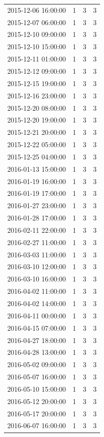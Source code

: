 \begin{tabular}{lrrr}
2015-12-06 16:00:00 & 1 & 3 & 3 \\
2015-12-07 06:00:00 & 1 & 3 & 3 \\
2015-12-10 09:00:00 & 1 & 3 & 3 \\
2015-12-10 15:00:00 & 1 & 3 & 3 \\
2015-12-11 01:00:00 & 1 & 3 & 3 \\
2015-12-12 09:00:00 & 1 & 3 & 3 \\
2015-12-15 19:00:00 & 1 & 3 & 3 \\
2015-12-16 23:00:00 & 1 & 3 & 3 \\
2015-12-20 08:00:00 & 1 & 3 & 3 \\
2015-12-20 19:00:00 & 1 & 3 & 3 \\
2015-12-21 20:00:00 & 1 & 3 & 3 \\
2015-12-22 05:00:00 & 1 & 3 & 3 \\
2015-12-25 04:00:00 & 1 & 3 & 3 \\
2016-01-13 15:00:00 & 1 & 3 & 3 \\
2016-01-19 16:00:00 & 1 & 3 & 3 \\
2016-01-19 17:00:00 & 1 & 3 & 3 \\
2016-01-27 23:00:00 & 1 & 3 & 3 \\
2016-01-28 17:00:00 & 1 & 3 & 3 \\
2016-02-11 22:00:00 & 1 & 3 & 3 \\
2016-02-27 11:00:00 & 1 & 3 & 3 \\
2016-03-03 11:00:00 & 1 & 3 & 3 \\
2016-03-10 12:00:00 & 1 & 3 & 3 \\
2016-03-10 16:00:00 & 1 & 3 & 3 \\
2016-04-02 11:00:00 & 1 & 3 & 3 \\
2016-04-02 14:00:00 & 1 & 3 & 3 \\
2016-04-11 00:00:00 & 1 & 3 & 3 \\
2016-04-15 07:00:00 & 1 & 3 & 3 \\
2016-04-27 18:00:00 & 1 & 3 & 3 \\
2016-04-28 13:00:00 & 1 & 3 & 3 \\
2016-05-02 09:00:00 & 1 & 3 & 3 \\
2016-05-07 16:00:00 & 1 & 3 & 3 \\
2016-05-10 15:00:00 & 1 & 3 & 3 \\
2016-05-12 20:00:00 & 1 & 3 & 3 \\
2016-05-17 20:00:00 & 1 & 3 & 3 \\
2016-06-07 16:00:00 & 1 & 3 & 3 \\

\end{tabular}
